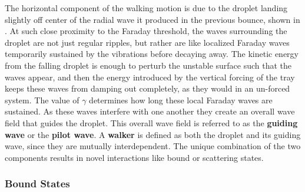  
The horizontal component of the walking motion is due to the droplet landing slightly off center of the radial wave it produced in the previous bounce, shown in . At such close proximity to the Faraday threshold, the waves surrounding the droplet are not just regular ripples, but rather are like localized Faraday waves temporarily sustained by the vibrations before decaying away. The kinetic energy from the falling droplet is enough to perturb the unstable surface such that the waves appear, and then the energy introduced by the vertical forcing of the tray keeps these waves from damping out completely, as they would in an un-forced system. The value of $\gamma$ determines how long these local Faraday waves are sustained. As these waves interfere with one another they create an overall wave field that guides the droplet. This overall wave field is referred to as the \textbf{guiding wave} or the \textbf{pilot wave}. A \textbf{walker} is defined as both the droplet and its guiding wave, since they are mutually interdependent. The unique combination of the two components results in novel interactions like bound or scattering states.



\subsubsection{Bound States}


